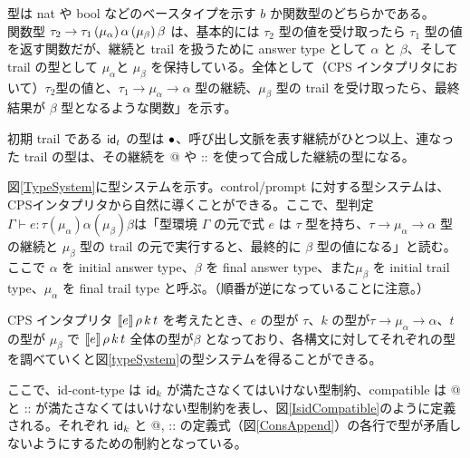 型は nat や bool などのベースタイプを示す $b$ か関数型のどちらかである。\\
関数型 ${\tau_2}\rightarrow{\tau_1}\,(\mu_{\alpha})\,\alpha\,(\mu_{\beta})\,\beta$ は、基本的には $\tau_2$ 型の値を受け取ったら $\tau_1$ 型の値を返す関数だが、継続と trail を扱うために answer type として $\alpha$ と $\beta$、そして trail の型として $\mu_{\alpha}$と $\mu_{\beta}$ を保持している。全体として（CPS インタプリタにおいて）$\tau_2$型の値と、$\tau_1 \rightarrow \mu_{\alpha} \rightarrow \alpha$ 型の継続、$\mu_{\beta}$ 型の trail を受け取ったら、最終結果が $\beta$ 型となるような関数」を示す。

初期 trail である $\textsf{id}_t$ の型は $\bullet$、呼び出し文脈を表す継続がひとつ以上、連なった trail の型は、その継続を @ や :: を使って合成した継続の型になる。

図\ref{TypeSystem}に型システムを示す。control/prompt に対する型システムは、CPSインタプリタから自然に導くことができる\cite{FSCD2021}。ここで、型判定$\Gamma \vdash e : \tau(\mu_{\alpha})\alpha(\mu_{\beta})\beta$は「型環境 $\Gamma$ の元で式 $e$ は $\tau$ 型を持ち、$\tau \rightarrow \mu_{\alpha} \rightarrow \alpha$ 型の継続と $\mu_{\beta}$ 型の trail の元で実行すると、最終的に $\beta$ 型の値になる」と読む。
ここで $\alpha$ を initial answer type、$\beta$ を final answer type、また$\mu_{\beta}$ を initial trail type、$\mu_{\alpha}$ を final trail type と呼ぶ。（順番が逆になっていることに注意。）

CPS インタプリタ $[\![{e}]\!]\,\rho\,k\,t$ を考えたとき、$e$ の型が $\tau$、$k$ の型が$\tau \rightarrow \mu_{\alpha} \rightarrow \alpha$、$t$ の型が $\mu_{\beta}$ で $[\![{e}]\!]\,\rho\,k\,t$ 全体の型が$\beta$ となっており、各構文に対してそれぞれの型を調べていくと図\ref{typeSystem}の型システムを得ることができる。

ここで、\textsf{id-cont-type} は $\textsf{id}_k$ が満たさなくてはいけない型制約、\textsf{compatible} は @ と :: が満たさなくてはいけない型制約を表し、図\ref{IsidCompatible}のように定義される。それぞれ $\textsf{id}_k$ と @, :: の定義式（図\ref{ConsAppend}）の各行で型が矛盾しないようにするための制約となっている。

